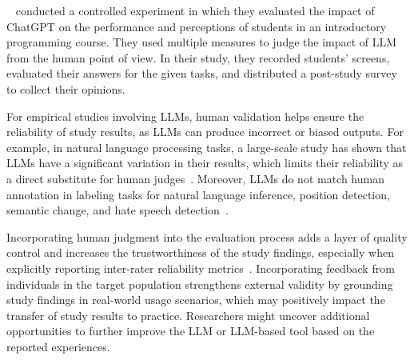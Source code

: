 \citeauthor{DBLP:conf/icse/XueCBTH24}~\cite{DBLP:conf/icse/XueCBTH24} conducted a controlled experiment in which they evaluated the impact of ChatGPT on the performance and perceptions of students in an introductory programming course.
They used multiple measures to judge the impact of LLM from the human point of view.
In their study, they recorded students' screens, evaluated their answers for the given tasks, and distributed a post-study survey to collect their opinions.



For empirical studies involving LLMs, human validation helps ensure the reliability of study results, as LLMs can produce incorrect or biased outputs.
For example, in natural language processing tasks, a large-scale study has shown that LLMs have a significant variation in their results, which limits their reliability as a direct substitute for human judges~\cite{DBLP:journals/corr/abs-2406-18403}. 
Moreover, LLMs do not match human annotation in labeling tasks for natural language inference, position detection, semantic change, and hate speech detection~\cite{DBLP:conf/chi/Wang0RMM24}.

Incorporating human judgment into the evaluation process adds a layer of quality control and increases the trustworthiness of the study findings, especially when explicitly reporting inter-rater reliability metrics~\cite{khraisha2024canlargelanguagemodelshumans}.
Incorporating feedback from individuals in the target population strengthens external validity by grounding study findings in real-world usage scenarios, which may positively impact the transfer of study results to practice.
Researchers might uncover additional opportunities to further improve the LLM or LLM-based tool based on the reported experiences.

